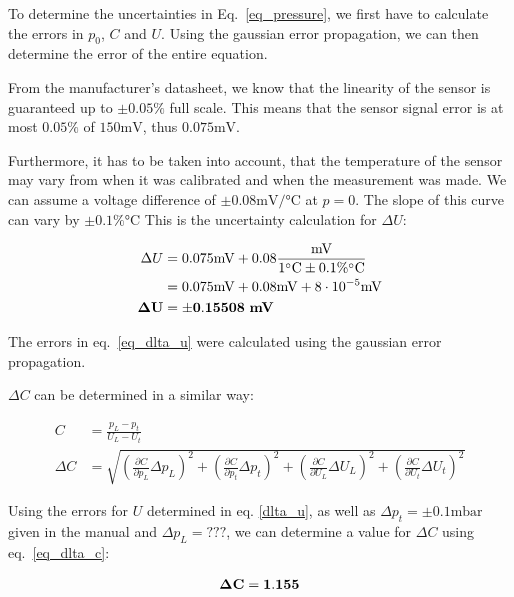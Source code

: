     To determine the uncertainties in Eq.~\ref{eq_pressure}, we first have to calculate the errors in $p_0$, $C$ and $U$.
    Using the gaussian error propagation, we can then determine the error of the entire equation.


    From the manufacturer's datasheet, we know that the linearity of the sensor is guaranteed up to $\pm 0.05\%$ full scale.
    This means that the sensor signal error is at most $0.05\%$ of $150\si{\milli\volt}$, thus $0.075\si{\milli\volt}$.

    Furthermore, it has to be taken into account, that the temperature of the sensor may vary from when
    it was calibrated and when the measurement was made. We can assume a voltage difference of $\pm 0.08\si{\milli\volt}/\si{\celsius}$ at $p = 0$.
    The slope of this curve can vary by $\pm 0.1\% \si{\celsius}$
    This is the uncertainty calculation for $\Delta U$:

    \begin{align}
        \Delta U &= 0.075 \si{\milli\volt} + 0.08 \frac{\si{\milli\volt}}{1 \si{\celsius} \pm 0.1 \% \si{\celsius}}\\
        &= 0.075 \si{\milli\volt} + 0.08 \si{\milli\volt} + 8 \cdot 10^{-5} \si{\milli\volt} \label{eq_dlta_u}\\
        \bf \Delta U &= \bf \pm 0.15508 ~\si{\bf\milli\volt} \label{dlta_u}
    \end{align}

    The errors in eq.~\ref{eq_dlta_u} were calculated using the gaussian error propagation.

    $\Delta C$ can be determined in a similar way:

    \begin{align}
        C &= \frac{p_L - p_t}{U_L - U_t}\\
        \Delta C &= \sqrt{ \left(\frac{\partial C}{\partial p_L} \Delta p_L \right)^2 +
                        \left(\frac{\partial C}{\partial p_t} \Delta p_t \right)^2 +
                        \left(\frac{\partial C}{\partial U_L} \Delta U_L \right)^2 +
                        \left(\frac{\partial C}{\partial U_t} \Delta U_t \right)^2 } \label{eq_dlta_c}
    \end{align}

    Using the errors for $U$ determined in eq. \ref{dlta_u}, as well as $\Delta p_t = \pm 0.1 \si{\milli\bar}$ given in the manual and $\Delta p_L = ???$,
    we can determine a value for $\Delta C$ using eq.~\ref{eq_dlta_c}:

    \begin{align}
        \bf \Delta C = 1.155 \label{dlta_c}
    \end{align}

